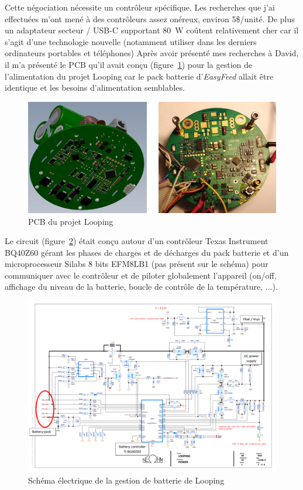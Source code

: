 \documentclass[a4paper, 12pt, sffamily]{report}
\begin{document}
Cette négociation nécessite un contrôleur spécifique. Les recherches que j’ai effectuées m’ont mené à des contrôleurs assez onéreux, environ 5\$/unité. De plus un adaptateur secteur / USB-C supportant \SI{80}{\watt} coûtent relativement cher car il s'agit d'une technologie nouvelle (notamment utiliser dans les derniers ordinateurs portables et téléphones)
Après avoir présenté mes recherches à David, il m'a présenté le PCB qu’il avait conçu (figure~\ref{fig:looping_pcb}) pour la gestion de l’alimentation du projet Looping car le pack batterie d'\emph{EasyFeed} allait être identique et les besoins d'alimentation semblables.

\begin{figure}[H]
\centering
\includegraphics[scale=1]{figures/photos/looping_pcb.jpg}
\caption{PCB du projet Looping}
\label{fig:looping_pcb}
\end{figure}

Le circuit (figure~\ref{fig:looping_charger}) était conçu autour d'un contrôleur Texas Instrument BQ40Z60 gérant les phases de charges et de décharges du pack batterie et d'un microprocesseur Silabs 8 bits EFM8LB1 (pas présent sur le schéma) pour communiquer avec le contrôleur et de piloter globalement l'appareil (on/off, affichage du niveau de la batterie, boucle de contrôle de la température, ...).

\begin{figure}[h]
\centering
\includegraphics[scale=0.6]{figures/screenshots/battery_charger.png}
\caption{Schéma électrique de la gestion de batterie de Looping}
\label{fig:looping_charger}
\end{figure}
\end{document}
